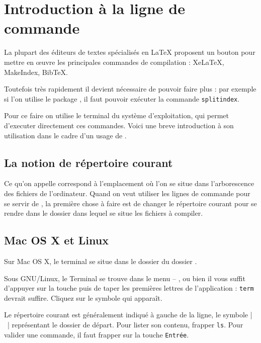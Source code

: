 \chapter{Introduction à la ligne de commande}\label{terminal}

\begin{intro}
La plupart des éditeurs de textes spécialisés en LaTeX  proposent un bouton pour mettre en œuvre les principales commandes de compilation :  XeLaTeX, MakeIndex, BibTeX.

Toutefois très rapidement il devient nécessaire de pouvoir faire plus : par exemple si l’on utilise le package , il faut pouvoir  exécuter la commande \verb|splitindex|.

Pour ce faire on utilise le terminal du système d'exploitation, qui permet d'executer directement ces commandes. Voici une breve introduction à son utilisation dans le cadre d'un usage de \XeLaTeX.
\end{intro}

\section{La notion de répertoire courant}\label{repcourant}

Ce qu'on appelle  correspond à l'emplacement où l'on se situe dans l'arborescence des fichiers de l'ordinateur. Quand on veut utiliser les lignes de commande pour se servir de \XeLaTeX, la première chose à faire est de changer le répertoire courant pour se rendre dans le dossier dans lequel se situe les fichiers à compiler.

\section{Mac OS X et Linux}

Sur Mac OS X, le terminal se situe dans le dossier  du dossier . 

Sous GNU/Linux, le Terminal se trouve dans le menu  – 
, ou bien il vous suffit d'appuyer sur la touche  puis de taper les premières lettres de l'application : \verb|term| devrait suffire. Cliquez sur le symbole qui apparaît.

Le répertoire courant est généralement indiqué à gauche de la ligne, le symbole  |~|  représentant le dossier de départ. Pour lister son contenu, frapper \verb|ls|. Pour valider une commande, il faut frapper sur la touche \verb|Entrée|.

